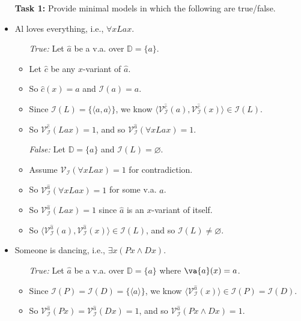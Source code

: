 \documentclass[a4paper, 11pt]{article} %
\newcommand{\tuple}[1]{\langle#1\rangle} %
\newcommand{\set}[1]{\lbrace#1\rbrace} %
\newcommand{\I}{\mathcal{I}}
\newcommand{\D}{\mathbb{D}}
\newcommand{\VV}[2]{\mathcal{V}_{#1}^{#2}} %
\begin{document}
\begin{itemize}
  \item[\bf Task 1:] Provide minimal models in which the following are true/false.
  \item Al loves everything, i.e., $\forall xLax$.
    \begin{itemize}
      \item[\it True:] Let $\hat{a}$ be a v.a. over $\D=\set{a}$.
      \item Let $\hat{c}$ be any $x$-variant of $\hat{a}$.
      \item So $\hat{c}(x)=a$ and $\I(a)=a$.
      \item Since $\I(L)=\set{\tuple{a,a}}$, we know $\tuple{\VV{\I}{\hat{c}}(a),\VV{\I}{\hat{c}}(x)}\in\I(L)$.
      \item So $\VV{\I}{\hat{c}}(Lax)=1$, and so $\VV{\I}{\hat{a}}(\forall xLax)=1$.
      \item[\it False:] Let $\D=\set{a}$ and $\I(L)=\varnothing$.
      \item Assume $\VV{\I}{}(\forall xLax)=1$ for contradiction. 
      \item So $\VV{\I}{\hat{a}}(\forall xLax)=1$ for some v.a. $\hat{a}$.
      \item So $\VV{\I}{\hat{a}}(Lax)=1$ since $\hat{a}$ is an $x$-variant of itself.
      \item So $\tuple{\VV{\I}{\hat{a}}(a),\VV{\I}{\hat{a}}(x)}\in\I(L)$, and so $\I(L)\neq\varnothing$.
    \end{itemize}
  \item Someone is dancing, i.e., $\exists x(Px \wedge Dx)$.
    \begin{itemize}
      \item[\it True:] Let $\hat{a}$ be a v.a. over $\D=\set{a}$ where $\va{a}(x)=a$.
      \item Since $\I(P)=\I(D)=\set{\tuple{a}}$, we know $\tuple{\VV{\I}{\hat{a}}(x)}\in\I(P)=\I(D)$.
      \item So $\VV{\I}{\hat{a}}(Px)=\VV{\I}{\hat{a}}(Dx)=1$, and so $\VV{\I}{\hat{a}}(Px \wedge Dx)=1$.

\end{itemize}
\end{itemize}
\end{document}
